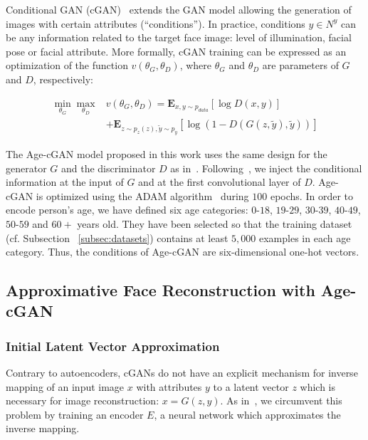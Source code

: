 \documentclass{article}
\begin{document}
Conditional GAN (cGAN)~\cite{mirza2014conditional,gauthier2014conditional} extends the GAN model allowing the generation of images with certain attributes (``conditions'').
In practice, conditions $y\in N^{y}$ can be any information related to the target face image: level of illumination, facial pose or facial attribute.
More formally, cGAN training can be expressed as an optimization of the function $v(\theta_{G},\theta_{D})$, where $\theta_{G}$ and $\theta_{D}$ are parameters of $G$ and $D$, respectively:

\begin{equation}
	\begin{split}
		\min_{\theta_{G}}\max_{\theta_{D}}{}&v(\theta_{G},\theta_{D})=\mathbf{E}_{x,y\sim p_{data}}[\log{D(x,y)}] \\ &+\mathbf{E}_{z\sim p_{z}(z),\widetilde{y}\sim p_{y}}[\log{(1-D(G(z,\widetilde{y}),\widetilde{y}))}]
	\end{split}
	\label{eqn:cgan}
\end{equation}

The Age-cGAN model proposed in this work uses the same design for the generator $G$ and the discriminator $D$ as in~\cite{radford2016unsupervised}.
Following~\cite{perarnau2016invertible}, we inject the conditional information at the input of $G$ and at the first convolutional layer of $D$.
Age-cGAN is optimized using the ADAM algorithm~\cite{kingma2014adam} during $100$ epochs.
In order to encode person's age, we have defined six age categories: $0$-$18$, $19$-$29$, $30$-$39$, $40$-$49$, $50$-$59$ and $60+$ years old.
They have been selected so that the training dataset (cf. Subsection ~\ref{subsec:datasets}) contains at least $5,000$ examples in each age category.
Thus, the conditions of Age-cGAN are six-dimensional one-hot vectors.

\subsection{Approximative Face Reconstruction with Age-cGAN}
\label{subsec:face_approximation_cgan}

\subsubsection{Initial Latent Vector Approximation}

Contrary to autoencoders, cGANs do not have an explicit mechanism for inverse mapping of an input image $x$ with attributes $y$ to a latent vector $z$ which is necessary for image reconstruction: $x=G(z,y)$.
As in~\cite{perarnau2016invertible,zhu2016generative}, we circumvent this problem by training an encoder $E$, a neural network which approximates the inverse mapping.
\end{document}
